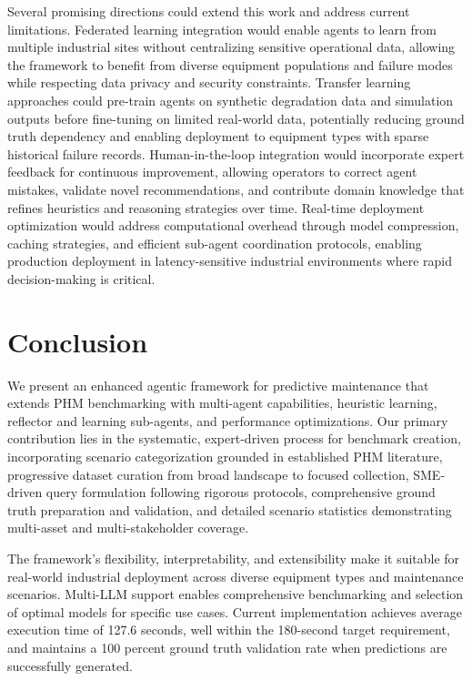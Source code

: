 \documentclass[conference]{IEEEtran}
\begin{document}
Several promising directions could extend this work and address current limitations. Federated learning integration would enable agents to learn from multiple industrial sites without centralizing sensitive operational data, allowing the framework to benefit from diverse equipment populations and failure modes while respecting data privacy and security constraints. Transfer learning approaches could pre-train agents on synthetic degradation data and simulation outputs before fine-tuning on limited real-world data, potentially reducing ground truth dependency and enabling deployment to equipment types with sparse historical failure records. Human-in-the-loop integration would incorporate expert feedback for continuous improvement, allowing operators to correct agent mistakes, validate novel recommendations, and contribute domain knowledge that refines heuristics and reasoning strategies over time. Real-time deployment optimization would address computational overhead through model compression, caching strategies, and efficient sub-agent coordination protocols, enabling production deployment in latency-sensitive industrial environments where rapid decision-making is critical.

\section{Conclusion}

We present an enhanced agentic framework for predictive maintenance that extends PHM benchmarking with multi-agent capabilities, heuristic learning, reflector and learning sub-agents, and performance optimizations. Our primary contribution lies in the systematic, expert-driven process for benchmark creation, incorporating scenario categorization grounded in established PHM literature, progressive dataset curation from broad landscape to focused collection, SME-driven query formulation following rigorous protocols, comprehensive ground truth preparation and validation, and detailed scenario statistics demonstrating multi-asset and multi-stakeholder coverage.

The framework's flexibility, interpretability, and extensibility make it suitable for real-world industrial deployment across diverse equipment types and maintenance scenarios. Multi-LLM support enables comprehensive benchmarking and selection of optimal models for specific use cases. Current implementation achieves average execution time of 127.6 seconds, well within the 180-second target requirement, and maintains a 100 percent ground truth validation rate when predictions are successfully generated.
\end{document}
